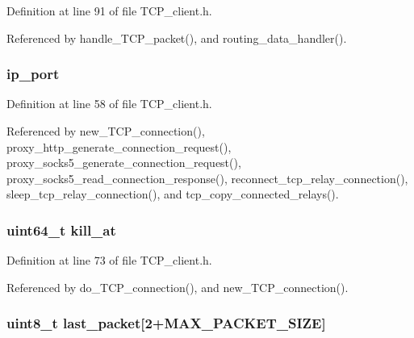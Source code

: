 Definition at line 91 of file T\+C\+P\+\_\+client.\+h.



Referenced by handle\+\_\+\+T\+C\+P\+\_\+packet(), and routing\+\_\+data\+\_\+handler().

\hypertarget{struct_t_c_p___client___connection_a86e2a5a56c0dd22df6e8b8a10e40f9e4}{
\subsubsection[{ip\+\_\+port}]{ ip\+\_\+port}}\label{struct_t_c_p___client___connection_a86e2a5a56c0dd22df6e8b8a10e40f9e4}


Definition at line 58 of file T\+C\+P\+\_\+client.\+h.



Referenced by new\+\_\+\+T\+C\+P\+\_\+connection(), proxy\+\_\+http\+\_\+generate\+\_\+connection\+\_\+request(), proxy\+\_\+socks5\+\_\+generate\+\_\+connection\+\_\+request(), proxy\+\_\+socks5\+\_\+read\+\_\+connection\+\_\+response(), reconnect\+\_\+tcp\+\_\+relay\+\_\+connection(), sleep\+\_\+tcp\+\_\+relay\+\_\+connection(), and tcp\+\_\+copy\+\_\+connected\+\_\+relays().

\hypertarget{struct_t_c_p___client___connection_a2da98b8c0615e4e5fe47dd5f3bdebfab}{
\subsubsection[{kill\+\_\+at}]{\setlength{\rightskip}{0pt plus 5cm}uint64\+\_\+t kill\+\_\+at}}\label{struct_t_c_p___client___connection_a2da98b8c0615e4e5fe47dd5f3bdebfab}


Definition at line 73 of file T\+C\+P\+\_\+client.\+h.



Referenced by do\+\_\+\+T\+C\+P\+\_\+connection(), and new\+\_\+\+T\+C\+P\+\_\+connection().

\hypertarget{struct_t_c_p___client___connection_af7b6d103d243e4267b112f6efe1573e2}{
\subsubsection[{last\+\_\+packet}]{\setlength{\rightskip}{0pt plus 5cm}uint8\+\_\+t last\+\_\+packet\mbox{[}2+{\bf M\+A\+X\+\_\+\+P\+A\+C\+K\+E\+T\+\_\+\+S\+I\+Z\+E}\mbox{]}}}\label{struct_t_c_p___client___connection_af7b6d103d243e4267b112f6efe1573e2}


